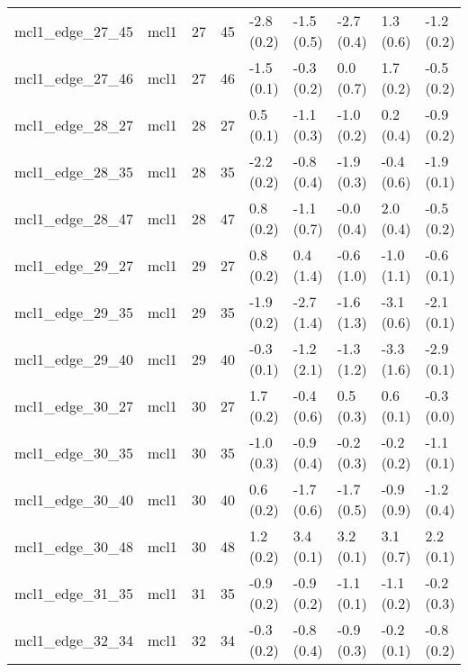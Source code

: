 \begin{tabular}{lllllllll}
mcl1\_edge\_27\_45                  &      mcl1 &          27 &          45 &  -2.8 (0.2) &        -1.5 (0.5) &  -2.7 (0.4) &   1.3 (0.6) &  -1.2 (0.2) \\
mcl1\_edge\_27\_46                  &      mcl1 &          27 &          46 &  -1.5 (0.1) &        -0.3 (0.2) &   0.0 (0.7) &   1.7 (0.2) &  -0.5 (0.2) \\
mcl1\_edge\_28\_27                  &      mcl1 &          28 &          27 &   0.5 (0.1) &        -1.1 (0.3) &  -1.0 (0.2) &   0.2 (0.4) &  -0.9 (0.2) \\
mcl1\_edge\_28\_35                  &      mcl1 &          28 &          35 &  -2.2 (0.2) &        -0.8 (0.4) &  -1.9 (0.3) &  -0.4 (0.6) &  -1.9 (0.1) \\
mcl1\_edge\_28\_47                  &      mcl1 &          28 &          47 &   0.8 (0.2) &        -1.1 (0.7) &  -0.0 (0.4) &   2.0 (0.4) &  -0.5 (0.2) \\
mcl1\_edge\_29\_27                  &      mcl1 &          29 &          27 &   0.8 (0.2) &         0.4 (1.4) &  -0.6 (1.0) &  -1.0 (1.1) &  -0.6 (0.1) \\
mcl1\_edge\_29\_35                  &      mcl1 &          29 &          35 &  -1.9 (0.2) &        -2.7 (1.4) &  -1.6 (1.3) &  -3.1 (0.6) &  -2.1 (0.1) \\
mcl1\_edge\_29\_40                  &      mcl1 &          29 &          40 &  -0.3 (0.1) &        -1.2 (2.1) &  -1.3 (1.2) &  -3.3 (1.6) &  -2.9 (0.1) \\
mcl1\_edge\_30\_27                  &      mcl1 &          30 &          27 &   1.7 (0.2) &        -0.4 (0.6) &   0.5 (0.3) &   0.6 (0.1) &  -0.3 (0.0) \\
mcl1\_edge\_30\_35                  &      mcl1 &          30 &          35 &  -1.0 (0.3) &        -0.9 (0.4) &  -0.2 (0.3) &  -0.2 (0.2) &  -1.1 (0.1) \\
mcl1\_edge\_30\_40                  &      mcl1 &          30 &          40 &   0.6 (0.2) &        -1.7 (0.6) &  -1.7 (0.5) &  -0.9 (0.9) &  -1.2 (0.4) \\
mcl1\_edge\_30\_48                  &      mcl1 &          30 &          48 &   1.2 (0.2) &         3.4 (0.1) &   3.2 (0.1) &   3.1 (0.7) &   2.2 (0.1) \\
mcl1\_edge\_31\_35                  &      mcl1 &          31 &          35 &  -0.9 (0.2) &        -0.9 (0.2) &  -1.1 (0.1) &  -1.1 (0.2) &  -0.2 (0.3) \\
mcl1\_edge\_32\_34                  &      mcl1 &          32 &          34 &  -0.3 (0.2) &        -0.8 (0.4) &  -0.9 (0.3) &  -0.2 (0.1) &  -0.8 (0.2) \\

\end{tabular}
